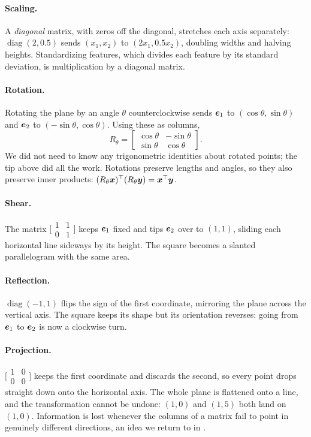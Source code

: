 \paragraph{Scaling.}
A \emph{diagonal} matrix, with zeros off the diagonal, stretches each axis
separately: $\operatorname{diag}(2, 0.5)$ sends $(x_1, x_2)$ to
$(2x_1, 0.5x_2)$, doubling widths and halving heights. Standardizing
features, which divides each feature by its standard deviation, is
multiplication by a diagonal matrix.

\paragraph{Rotation.}
Rotating the plane by an angle $\theta$ counterclockwise sends
$\bm{e}_1$ to $(\cos\theta, \sin\theta)$ and $\bm{e}_2$ to
$(-\sin\theta, \cos\theta)$. Using these as columns,
\[
  R_\theta =
  \begin{bmatrix}
    \cos\theta & -\sin\theta \\
    \sin\theta & \cos\theta
  \end{bmatrix}.
\]
We did not need to know any trigonometric identities about rotated
points; the tip above did all the work. Rotations preserve lengths and
angles, so they also preserve inner products:
$(R_\theta \bm{x})^\top (R_\theta \bm{y}) = \bm{x}^\top \bm{y}$.

\paragraph{Shear.}
The matrix $\bigl[\begin{smallmatrix} 1 & 1 \\ 0 & 1
\end{smallmatrix}\bigr]$ keeps
$\bm{e}_1$ fixed and tips $\bm{e}_2$ over to $(1, 1)$, sliding each
horizontal line sideways by its height. The square becomes a slanted
parallelogram with the same area.

\paragraph{Reflection.}
$\operatorname{diag}(-1, 1)$ flips the sign of the first coordinate,
mirroring the plane across the vertical axis. The square keeps its shape
but its orientation reverses: going from $\bm{e}_1$ to $\bm{e}_2$ is
now a clockwise turn.

\paragraph{Projection.}
$\bigl[\begin{smallmatrix} 1 & 0 \\ 0 & 0 \end{smallmatrix}\bigr]$ keeps
the first coordinate
and discards the second, so every point drops straight down onto the
horizontal axis. The whole plane is flattened onto a line, and the
transformation cannot be undone: $(1, 0)$ and $(1, 5)$ both land on
$(1, 0)$. Information is lost whenever the columns of a matrix fail to
point in genuinely different directions, an idea we return to in
.

